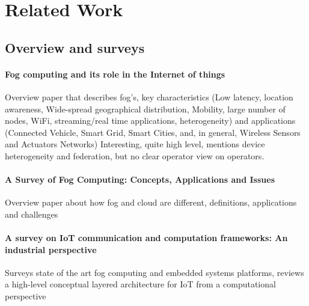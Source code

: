 \section{Related Work}



\subsection{Overview and surveys}

\paragraph{Fog computing and its role in the Internet of things} \cite{Bonomi:2012:FCR:2342509.2342513}
Overview paper that describes fog's, key characteristics (Low latency, location awareness, Wide-spread geographical distribution, Mobility, large number of nodes, WiFi, streaming/real time applications, heterogeneity) and applications (Connected Vehicle, Smart Grid, Smart Cities, and, in general, Wireless Sensors and Actuators Networks)
Interesting, quite high level, mentions device heterogeneity and federation,
but no clear operator view on operators.


\paragraph{A Survey of Fog Computing: Concepts, Applications and Issues} \cite{Yi:2015:SFC:2757384.2757397}
Overview paper about how fog and cloud are different, definitions, applications and challenges

\paragraph{A survey on IoT communication and computation frameworks: An industrial perspective}\cite{7868354}
Surveys state of the art fog computing and embedded systems platforms, reviews a high-level conceptual layered architecture for IoT from a computational perspective

